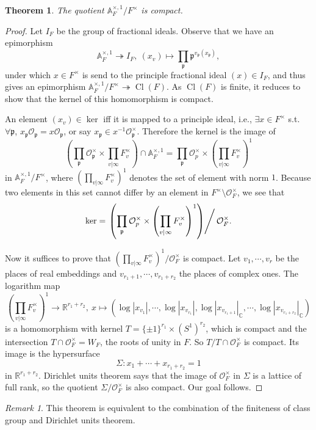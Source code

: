 \documentclass{article}
\newtheorem{theorem}{Theorem}
\theoremstyle{definition}
\theoremstyle{remark}
\newtheorem*{remark}{Remark}
\newcommand{\R}{\mathbb{R}}
\newcommand{\C}{\mathbb{C}}
\newcommand{\ideone}[1]{\mathbb{A}_{#1}^{\times, 1}}
\newcommand{\idecl}[1]{\mathbb{A}_{#1}^{\times, 1}/#1^{\times}}
\renewcommand{\O}{\mathcal{O}}
\newcommand{\frp}{\mathfrak{p}}
\DeclareMathOperator{\cl}{Cl}
\begin{document}
\begin{theorem}
    The quotient $\ideone{F}/F^{\times}$ is compact.
\end{theorem}
\begin{proof}
    Let $I_F$ be the group of fractional ideals.
    Observe that we have an epimorphism \[\ideone{F}\twoheadrightarrow  I_F,\ (x_v)\mapsto \prod_{\frp} \frp^{v_{\frp}(x_\frp)},\]
    under which $x\in F^\times$ is send to the principle fractional ideal $(x)\in I_F$, and thus gives an epimorphism $\idecl{F}\twoheadrightarrow \cl(F)$.
    As $\cl(F)$ is finite, it reduces to show that the kernel of this homomorphism is compact.

    An element $(x_v)\in\ker$ iff it is mapped to a principle ideal, i.e., $\exists x\in F^{\times}$ s.t. $\forall \frp$, $x_\frp\O_\frp = x\O_\frp$, or say $x_\frp\in x^{-1}\O_\frp^\times$.
    Therefore the kernel is the image of \[\left(\prod_\frp\O_\frp^\times\times\prod_{v|\infty} F_v^\times\right) \cap\ideone{F} = \prod_\frp \O_p^\times\times\left( \prod_{v|\infty} F_v^{\times} \right)^1\]
    in $\idecl{F}$, where $\left( \prod_{v|\infty} F_v^{\times} \right)^1$ denotes the set of element with norm $1$.
    Because two elements in this set cannot differ by an element in $F^\times\setminus\O_F^\times$, we see that\[\ker = \left.\left( \prod_\frp \O_p^\times\times\left( \prod_{v|\infty} F_v^{\times} \right)^1 \right)\right\slash \O_F^\times.\]

    Now it suffices to prove that $\left( \prod_{v|\infty} F_v^{\times} \right)^1\big/\O_F^\times$ is compact.
    Let $v_1, \cdots, v_r$ be the places of real embeddings and $v_{r_1+1},\cdots,  v_{r_1+r_2}$ the places of complex ones.
    The logarithm map \[\left( \prod_{v|\infty} F_v^{\times} \right)^1\to\R^{r_1+r_2},\ x\mapsto (\log|x_{v_1}|, \cdots, \log|x_{v_{r_1}}|,\log|x_{v_{r_1+1}} |_{\C},\cdots, \log|x_{v_{r_1+r_2}}|_\C)\]
    is a homomorphism with kernel $T = \{\pm 1\}^{r_1}\times (S^1)^{r_2}$, which is compact and the intersection $T\cap\O_F^\times = W_F$, the roots of unity in $F$. So $T/T\cap\O_F^\times$ is compact.
    Its image is the hypersurface \[\Sigma: x_1 + \cdots + x_{r_1+r_2} = 1\] in $\R^{r_1+r_2}$.
    Dirichlet units theorem says that the image of $\O_F^\times$ in $\Sigma$ is a lattice of full rank, so the quotient $\Sigma/\O_F^\times$ is also compact.
    Our goal follows.
\end{proof}
\begin{remark}
    This theorem is equivalent to the combination of the finiteness of class group and Dirichlet units theorem.
\end{remark}
\end{document}
